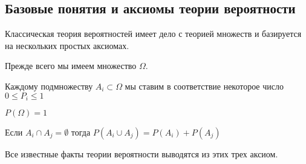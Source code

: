 \subsection{Базовые понятия и аксиомы теории вероятности}

Классическая теория вероятностей имеет дело с теорией множеств и
базируется на нескольких простых аксиомах. 

Прежде всего мы имеем множество $\Omega$.
\begin{axiom}
\label{axProbabilityKolmogorov1}
Каждому подмножеству $A_i \subset \Omega$ мы ставим в соответствие
некоторое число $0 \le P_i \le 1$
\end{axiom}

\begin{axiom}
\label{axProbabilityKolmogorov2}
$P\left(\Omega\right) = 1$
\end{axiom}

\begin{axiom}
\label{axProbabilityKolmogorov3}
Если $A_i \cap A_j = \emptyset$ тогда 
$P\left(A_i \cup A_j\right) = P\left(A_i\right) + P\left(A_j\right)$
\end{axiom}

Все известные факты теории вероятности выводятся из этих трех аксиом.  
